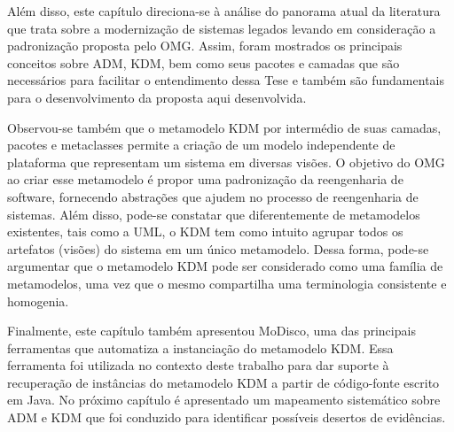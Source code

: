 Além disso, este capítulo direciona-se à análise do panorama atual da literatura que trata sobre a modernização de sistemas legados levando em consideração a padronização proposta pelo OMG. Assim, foram mostrados os principais conceitos sobre ADM, KDM, bem como seus pacotes e camadas que são necessários para facilitar o entendimento dessa Tese e também são fundamentais para o desenvolvimento da proposta aqui desenvolvida.

Observou-se também que o metamodelo KDM por intermédio de suas camadas, pacotes e metaclasses permite a criação de um modelo independente de plataforma que representam um sistema em diversas visões. O objetivo do OMG ao criar esse metamodelo é propor uma padronização da reengenharia de software, fornecendo abstrações que ajudem no processo de reengenharia de sistemas. Além disso, pode-se constatar que diferentemente de metamodelos existentes, tais como a UML, o KDM tem como intuito agrupar todos os artefatos (visões) do sistema em um único metamodelo. Dessa forma, pode-se argumentar que o metamodelo KDM pode ser considerado como uma família de metamodelos, uma vez que o mesmo compartilha uma terminologia consistente e homogenia.

Finalmente, este capítulo também apresentou MoDisco, uma das principais ferramentas que automatiza a instanciação do metamodelo KDM. Essa ferramenta foi utilizada no contexto deste trabalho para dar suporte à recuperação de instâncias do metamodelo KDM a partir de código-fonte escrito em Java. No próximo capítulo é apresentado um mapeamento sistemático sobre ADM e KDM que foi conduzido para identificar possíveis desertos de evidências.
